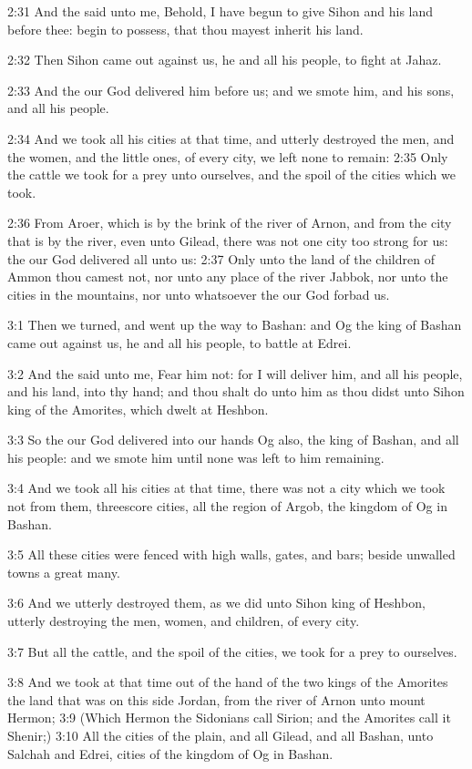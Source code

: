 2:31 And the \LORD said unto me, Behold, I have begun to give Sihon and
his land before thee: begin to possess, that thou mayest inherit his
land.

2:32 Then Sihon came out against us, he and all his people, to fight
at Jahaz.

2:33 And the \LORD our God delivered him before us; and we smote him,
and his sons, and all his people.

2:34 And we took all his cities at that time, and utterly destroyed
the men, and the women, and the little ones, of every city, we left
none to remain: 2:35 Only the cattle we took for a prey unto
ourselves, and the spoil of the cities which we took.

2:36 From Aroer, which is by the brink of the river of Arnon, and from
the city that is by the river, even unto Gilead, there was not one
city too strong for us: the \LORD our God delivered all unto us: 2:37
Only unto the land of the children of Ammon thou camest not, nor unto
any place of the river Jabbok, nor unto the cities in the mountains,
nor unto whatsoever the \LORD our God forbad us.

3:1 Then we turned, and went up the way to Bashan: and Og the king of
Bashan came out against us, he and all his people, to battle at Edrei.

3:2 And the \LORD said unto me, Fear him not: for I will deliver him,
and all his people, and his land, into thy hand; and thou shalt do
unto him as thou didst unto Sihon king of the Amorites, which dwelt at
Heshbon.

3:3 So the \LORD our God delivered into our hands Og also, the king of
Bashan, and all his people: and we smote him until none was left to
him remaining.

3:4 And we took all his cities at that time, there was not a city
which we took not from them, threescore cities, all the region of
Argob, the kingdom of Og in Bashan.

3:5 All these cities were fenced with high walls, gates, and bars;
beside unwalled towns a great many.

3:6 And we utterly destroyed them, as we did unto Sihon king of
Heshbon, utterly destroying the men, women, and children, of every
city.

3:7 But all the cattle, and the spoil of the cities, we took for a
prey to ourselves.

3:8 And we took at that time out of the hand of the two kings of the
Amorites the land that was on this side Jordan, from the river of
Arnon unto mount Hermon; 3:9 (Which Hermon the Sidonians call Sirion;
and the Amorites call it Shenir;) 3:10 All the cities of the plain,
and all Gilead, and all Bashan, unto Salchah and Edrei, cities of the
kingdom of Og in Bashan.

